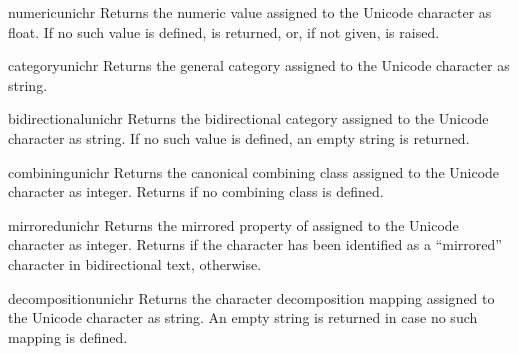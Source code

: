 \begin{funcdesc}{numeric}{unichr}
  Returns the numeric value assigned to the Unicode character
   as float. If no such value is defined,  is
  returned, or, if not given,  is raised.
\end{funcdesc}

\begin{funcdesc}{category}{unichr}
  Returns the general category assigned to the Unicode character
   as string.
\end{funcdesc}

\begin{funcdesc}{bidirectional}{unichr}
  Returns the bidirectional category assigned to the Unicode character
   as string. If no such value is defined, an empty string
  is returned.
\end{funcdesc}

\begin{funcdesc}{combining}{unichr}
  Returns the canonical combining class assigned to the Unicode
  character  as integer. Returns  if no combining
  class is defined.
\end{funcdesc}

\begin{funcdesc}{mirrored}{unichr}
  Returns the mirrored property of assigned to the Unicode character
   as integer. Returns  if the character has been
  identified as a ``mirrored'' character in bidirectional text,
   otherwise.
\end{funcdesc}

\begin{funcdesc}{decomposition}{unichr}
  Returns the character decomposition mapping assigned to the Unicode
  character  as string. An empty string is returned in case
  no such mapping is defined.
\end{funcdesc}
